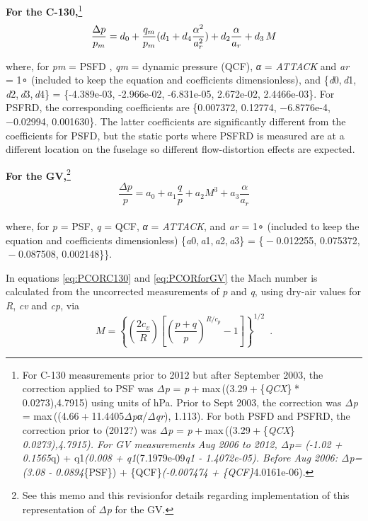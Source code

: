 \documentclass[
]{book}
\begin{document}
\textbf{For the C-130,}\footnote{For C-130 measurements prior to 2012 but after September 2003, the correction applied to PSF was \emph{Δp} = \emph{p} + max ((3.29 + \{\emph{QCX}\} * 0.0273),4.7915) using units of hPa. Prior to Sept 2003, the correction was {\emph{Δp} = max ((4.66 + 11.4405\emph{Δp}\emph{α}/\emph{Δq}\emph{r}}), 1.113). For both PSFD and PSFRD, the correction prior to (2012?) was {\emph{Δp} = \emph{p} + max ((3.29 + \{\emph{QCX}\} \emph{ 0.0273),4.7915). For GV measurements Aug 2006 to 2012, {\emph{Δp}=} (-1.02 + 0.1565}}q) + q1{\emph{(0.008 + q1}}(7.1979e-09{\emph{q1 - 1.4072e-05). Before Aug 2006: {\emph{Δp}=}(3.08 - 0.0894}}\{PSF\}) + \{QCF\}{\emph{(-0.007474 + \{QCF\}}}4.0161e-06).}
\begin{equation}
\frac{\Delta p}{p_{m}}=d_{0}+\frac{q_{m}}{p_{m}}(d_{1}+d_{4}\frac{\alpha^{2}}{a_{r}^{2}})+d_{2}\frac{\alpha}{a_{r}}+d_{3}\thinspace M
\label{eq:PCORC130}
\end{equation}

where, for {\emph{p}\emph{m}} = PSFD , {\emph{q}\emph{m}} = dynamic pressure (QCF), {\emph{α} = \emph{ATTACK}} and {\emph{a}\emph{r} = 1∘} (included to keep the equation and coefficients dimensionless), and \{{\emph{d}0, \emph{d}1, \emph{d}2, \emph{d}3, \emph{d}4}\} = \{-4.389e-03, -2.966e-02, -6.831e-05, 2.672e-02, 2.4466e-03\}. For PSFRD, the corresponding coefficients are \{0.007372, 0.12774, {−}6.8776e-4, {−}0.02994, 0.001630\}. The latter coefficients are significantly different from the coefficients for PSFD, but the static ports where PSFRD is measured are at a different location on the fuselage so different flow-distortion effects are expected.

\textbf{For the GV,}\footnote{See this memo and this revisionfor details regarding implementation of this representation of {\emph{Δp}} for the GV.}
\begin{equation}
\frac{\Delta p}{p}=a_{0}+a_{1}\frac{q}{p}+a_{2}M^{3}+a_{3}\frac{\alpha}{a_{r}}
\label{eq:PCORforGV}
\end{equation}\\
where, for {\emph{p}} = PSF, {\emph{q}} = QCF, {\emph{α} = \emph{ATTACK}}, and {\emph{a}\emph{r} = 1∘} (included to keep the equation and coefficients dimensionless) \{{\emph{a}0, \emph{a}1, \emph{a}2, \emph{a}3}\} = \{{ − 0.012255}, {0.075372}, { − 0.087508}, {0.002148}\}\}.

In equations \eqref{eq:PCORC130} and \eqref{eq:PCORforGV} the Mach number is calculated from the uncorrected measurements of {\emph{p}} and {\emph{q}}, using dry-air values for {\emph{R}}, {\emph{c}\emph{v}} and {\emph{c}\emph{p}}, via\\
\begin{equation}
M=\left\{ \left(\frac{2c_{v}}{R}\right)\left[\left(\frac{p+q}{p}\right)^{R/c_{p}}-1\right]\right\}^{1/2}\,\,\,.
\label{eq:MachEquation}
\end{equation}
\end{document}

